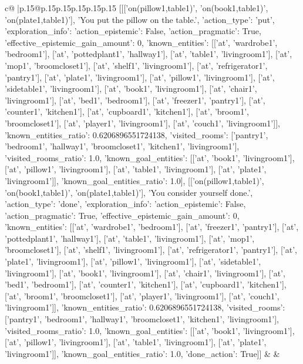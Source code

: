 \documentclass{article}
\begin{document}
{\begin{supertabular}{c@{$\;$}|p{.15\linewidth}@{}p{.15\linewidth}p{.15\linewidth}p{.15\linewidth}p{.15\linewidth}p{.15\linewidth}}
{{{	 [[['on(pillow1,table1)', 'on(book1,table1)', 'on(plate1,table1)'], 'You put the pillow on the table.', {'action_type': 'put', 'exploration_info': {'action_epistemic': False, 'action_pragmatic': True, 'effective_epistemic_gain_amount': 0, 'known_entities': [['at', 'wardrobe1', 'bedroom1'], ['at', 'pottedplant1', 'hallway1'], ['at', 'table1', 'livingroom1'], ['at', 'mop1', 'broomcloset1'], ['at', 'shelf1', 'livingroom1'], ['at', 'refrigerator1', 'pantry1'], ['at', 'plate1', 'livingroom1'], ['at', 'pillow1', 'livingroom1'], ['at', 'sidetable1', 'livingroom1'], ['at', 'book1', 'livingroom1'], ['at', 'chair1', 'livingroom1'], ['at', 'bed1', 'bedroom1'], ['at', 'freezer1', 'pantry1'], ['at', 'counter1', 'kitchen1'], ['at', 'cupboard1', 'kitchen1'], ['at', 'broom1', 'broomcloset1'], ['at', 'player1', 'livingroom1'], ['at', 'couch1', 'livingroom1']], 'known_entities_ratio': 0.6206896551724138, 'visited_rooms': ['pantry1', 'bedroom1', 'hallway1', 'broomcloset1', 'kitchen1', 'livingroom1'], 'visited_rooms_ratio': 1.0, 'known_goal_entities': [['at', 'book1', 'livingroom1'], ['at', 'pillow1', 'livingroom1'], ['at', 'table1', 'livingroom1'], ['at', 'plate1', 'livingroom1']], 'known_goal_entities_ratio': 1.0}}], [['on(pillow1,table1)', 'on(book1,table1)', 'on(plate1,table1)'], 'You consider yourself done.', {'action_type': 'done', 'exploration_info': {'action_epistemic': False, 'action_pragmatic': True, 'effective_epistemic_gain_amount': 0, 'known_entities': [['at', 'wardrobe1', 'bedroom1'], ['at', 'freezer1', 'pantry1'], ['at', 'pottedplant1', 'hallway1'], ['at', 'table1', 'livingroom1'], ['at', 'mop1', 'broomcloset1'], ['at', 'shelf1', 'livingroom1'], ['at', 'refrigerator1', 'pantry1'], ['at', 'plate1', 'livingroom1'], ['at', 'pillow1', 'livingroom1'], ['at', 'sidetable1', 'livingroom1'], ['at', 'book1', 'livingroom1'], ['at', 'chair1', 'livingroom1'], ['at', 'bed1', 'bedroom1'], ['at', 'counter1', 'kitchen1'], ['at', 'cupboard1', 'kitchen1'], ['at', 'broom1', 'broomcloset1'], ['at', 'player1', 'livingroom1'], ['at', 'couch1', 'livingroom1']], 'known_entities_ratio': 0.6206896551724138, 'visited_rooms': ['pantry1', 'bedroom1', 'hallway1', 'broomcloset1', 'kitchen1', 'livingroom1'], 'visited_rooms_ratio': 1.0, 'known_goal_entities': [['at', 'book1', 'livingroom1'], ['at', 'pillow1', 'livingroom1'], ['at', 'table1', 'livingroom1'], ['at', 'plate1', 'livingroom1']], 'known_goal_entities_ratio': 1.0}, 'done_action': True}]] 
	  } 
	   } 
	   } 
	 & & \\ 
 

    \theutterance {}  


\end{supertabular}}
\end{document}
